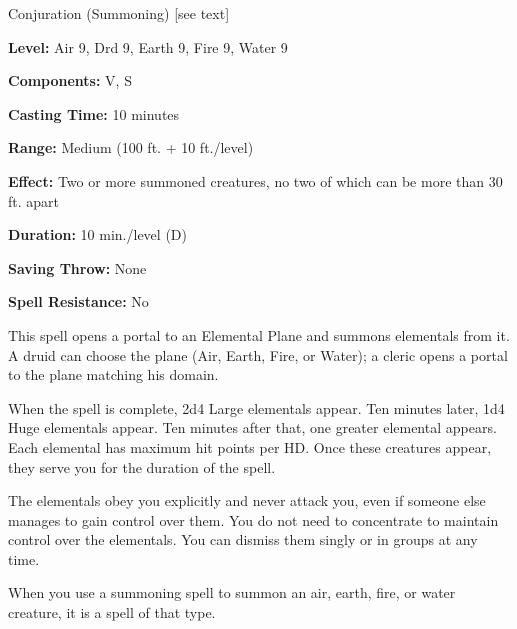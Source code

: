 
Conjuration (Summoning) [see text]

\textbf{Level:} Air 9, Drd 9, Earth 9, Fire 9, Water 9

\textbf{Components:} V, S

\textbf{Casting Time:} 10 minutes

\textbf{Range:} Medium (100 ft. + 10 ft./level)

\textbf{Effect:} Two or more summoned creatures, no two of which can be more than 
30 ft. apart

\textbf{Duration:} 10 min./level (D)

\textbf{Saving Throw:} None

\textbf{Spell Resistance:} No

This spell opens a portal to an Elemental Plane and summons elementals from it. 
A druid can choose the plane (Air, Earth, Fire, or Water); a cleric opens a portal 
to the plane matching his domain.

When the spell is complete, 2d4 Large elementals appear. Ten minutes later, 1d4 
Huge elementals appear. Ten minutes after that, one greater elemental appears. 
Each elemental has maximum hit points per HD. Once these creatures appear, they 
serve you for the duration of the spell.

The elementals obey you explicitly and never attack you, even if someone else manages 
to gain control over them. You do not need to concentrate to maintain control over 
the elementals. You can dismiss them singly or in groups at any time.

When you use a summoning spell to summon an air, earth, fire, or water creature, 
it is a spell of that type.

